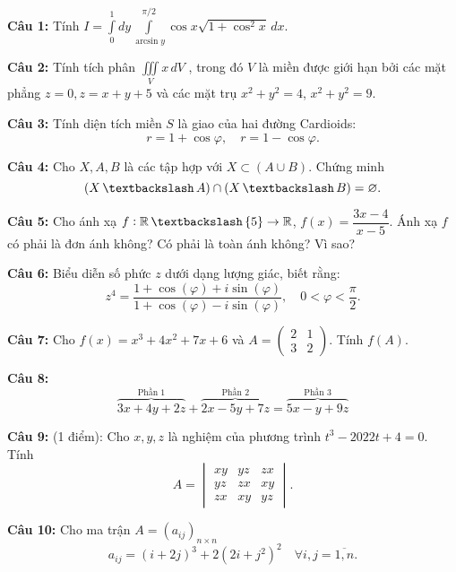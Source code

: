\documentclass[12pt, a4paper]{article}
\begin{document}
    \textbf{Câu 1:} Tính $I = \displaystyle\int\limits_{0}^{1} dy \displaystyle\int\limits_{\arcsin y}^{\pi / 2} \cos x \sqrt{1 + \cos ^ 2 x}\, dx$.

    \textbf{Câu 2:} Tính tích phân $\displaystyle\iiint\limits_{V} x \, dV$ , trong đó $V$ là miền được giới hạn bởi các mặt phẳng $z = 0, z = x + y + 5$ và các mặt trụ $x^2 + y^2 = 4$, $x^2 + y^2 = 9$.

    \textbf{Câu 3:} Tính diện tích miền $S$ là giao của hai đường Cardioids:
    $$r = 1 + \cos \varphi, \quad r = 1 - \cos \varphi.$$

    \textbf{Câu 4:} Cho $X, A, B$ là các tập hợp với $X \subset (A \cup B)$. Chứng minh
    $$(X \, \textbackslash \, A) \cap (X \, \textbackslash \, B) = \varnothing.$$

    \textbf{Câu 5:} Cho ánh xạ $f: \mathbb{R} \, \textbackslash \left\{5\right\} \rightarrow \mathbb{R}$, $f(x) = \dfrac{3x - 4}{x - 5}$. Ánh xạ $f$ có phải là đơn ánh không? Có phải là toàn ánh không? Vì sao?

    \textbf{Câu 6:} Biểu diễn số phức $z$ dưới dạng lượng giác, biết rằng:
    $$z^4 = \dfrac{1 + \cos (\varphi) + i \sin (\varphi)}{1 + \cos (\varphi) - i \sin (\varphi)}, \quad 0 < \varphi < \dfrac{\pi}{2}.$$

    \textbf{Câu 7:} Cho $f(x) = x^3 + 4x^2 + 7x + 6$ và $A = \begin{pmatrix}
        2 & 1 \\
        3 & 2 
    \end{pmatrix}$. Tính $f(A)$.

    \textbf{Câu 8:} 
    \begin{equation}
        \overbrace{3x + 4y + 2z}^{\text{Phần 1}} + \overbrace{2x - 5y + 7z}^{\text{Phần 2}} = \overbrace{5x - y + 9z}^{\text{Phần 3}}        
    \end{equation}

    \textbf{Câu 9:} (1 điểm): Cho $x, y, z$ là nghiệm của phương trình $t^3 - 2022t + 4 = 0$. \\
    Tính
    $$A = \begin{vmatrix}
        xy & yz & zx \\
        yz & zx & xy \\
        zx & xy & yz
    \end{vmatrix}.$$

    \textbf{Câu 10:} Cho ma trận $A = \left(a_{ij}\right)_{n \times n}$
    $$ a_{ij} = (i + 2j)^3 + 2(2i + j^2)^2 \quad \forall i, j = \overline{1, n}. $$ 
\end{document}
